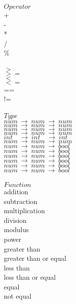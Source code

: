 ﻿\documentclass[5pt]{article}
\begin{document}
\begin{multicols}{3}
\noindent $Operator$ \\
\hspace*{5mm} + \\
\hspace*{5mm} - \\
\hspace*{5mm} * \\
\hspace*{5mm} / \\
\hspace*{5mm} \% \\
\hspace*{5mm} \^ \\
\hspace*{5mm} $>$ \\
\hspace*{5mm} $>=$ \\
\hspace*{5mm} $<$ \\
\hspace*{5mm} $<=$ \\
\hspace*{5mm} == \\
\hspace*{5mm} != \\
\columnbreak \\
\noindent $Type$ \\
$num \ \rightarrow \ num \ \rightarrow \ num $ \\
$num \ \rightarrow \ num \ \rightarrow \ num $ \\
$num \ \rightarrow \ num \ \rightarrow \ num $ \\
$num \ \rightarrow \ num \ \rightarrow \ num $ \\
$int \quad \rightarrow \ int \quad \rightarrow \ int $ \\
$num \ \rightarrow \ num \ \rightarrow \ num $ \\
$num \ \rightarrow \ num \ \rightarrow \ bool $ \\
$num \ \rightarrow \ num \ \rightarrow \ bool $ \\
$num \ \rightarrow \ num \ \rightarrow \ bool $ \\
$num \ \rightarrow \ num \ \rightarrow \ bool $ \\
$num \ \rightarrow \ num \ \rightarrow \ bool $ \\
$num \ \rightarrow \ num \ \rightarrow \ bool $ \\
\columnbreak \\
$Function$ \\
addition \\
subtraction \\
multiplication \\
division \\
modulus \\
power \\
greater than \\
greater than or equal \\
less than \\
less than or equal \\
equal \\
not equal \\
\end{multicols}
\end{document}

